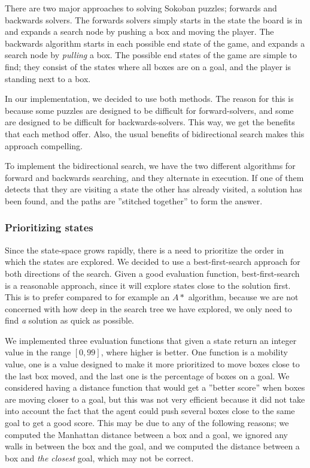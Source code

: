 \documentclass[a4paper,11pt]{article}
\begin{document}
There are two major approaches to solving Sokoban puzzles; forwards and backwards solvers.
The forwards solvers simply starts in the state the board is in and expands a search node
by pushing a box and moving the player.
The backwards algorithm starts in each possible end state of the game,
and expands a search node by \emph{pulling} a box.
The possible end states of the game are simple to find;
they consist of the states where all boxes are on a goal, and the player
is standing next to a box.

In our implementation, we decided to use both methods.
The reason for this is because some puzzles are designed to be difficult
for forward-solvers, and some are designed to be difficult for backwards-solvers.
This way, we get the benefits that each method offer.
Also, the usual benefits of bidirectional search makes this approach compelling.

To implement the bidirectional search, we have the two different algorithms
for forward and backwards searching, and they alternate in execution.
If one of them detects that they are visiting a state the other has already visited,
a solution has been found, and the paths are ''stitched together'' to form the answer.

\subsubsection{Prioritizing states}
\label{sec:prio}

Since the state-space grows rapidly, there is a need to
prioritize the order in which the states are explored.
We decided to use a best-first-search approach for both directions of the search.
Given a good evaluation function, best-first-search is a reasonable
approach, since it will explore states close to the solution first.
This is to prefer compared to for example an $A*$ algorithm,
because we are not concerned with how deep in the
search tree we have explored, we only need to find 
\emph{a} solution as quick as possible.

We implemented three evaluation functions that given a state return an integer value in the range
$[0, 99]$, where higher is better.
One function is a mobility value, one is a value designed to make
it more prioritized to move boxes close to the last box moved,
and the last one is the percentage of boxes on a goal.
We considered having a distance function that would get a ''better score''
when boxes are moving closer to a goal, but this was not very efficient
because it did not take into account the fact that the agent could push several boxes
close to the same goal to get a good score.
This may be due to any of the following reasons;
	we computed the Manhattan distance between a box and a goal,
	we ignored any walls in between the box and the goal,
	and we computed the distance between a box and \emph{the closest} goal, which may not be correct.
\end{document}
